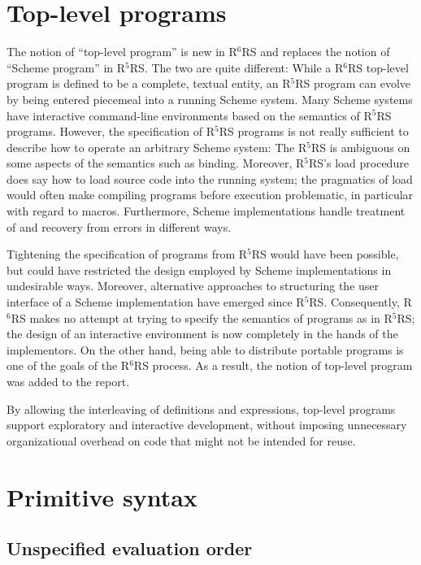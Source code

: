 \documentclass[twoside,twocolumn]{algol60}
\newcommand{\rn}[1]{R$^{#1}$RS}
\begin{document}
\chapter{Top-level programs}

The notion of ``top-level program'' is new in \rn{6} and replaces the
notion of ``Scheme program'' in \rn{5}.  The two are quite different:
While a \rn{6} top-level program is defined to be a complete, textual
entity, an \rn{5} program can evolve by being entered piecemeal into
a running Scheme system.  Many Scheme systems have interactive
command-line environments based on the semantics of \rn{5} programs.
However, the specification of \rn{5} programs is not really
sufficient to describe how to operate an arbitrary Scheme system: The
\rn{5} is ambiguous on some aspects of the semantics such as binding.
Moreover, \rn{5}'s {\cf load} procedure does say how to load source
code into the running system; the pragmatics of {\cf load} would
often make compiling programs before execution problematic, in
particular with regard to macros.  Furthermore, Scheme implementations
handle treatment of and recovery from errors in different ways.

Tightening the specification of programs from \rn{5} would have been
possible, but could have restricted the design employed by Scheme
implementations in undesirable ways.  Moreover, alternative approaches
to structuring the user interface of a Scheme implementation have
emerged since \rn{5}.  Consequently, \rn{6} makes no attempt at trying
to specify the semantics of programs as in \rn{5}; the design of an
interactive environment is now completely in the hands of the
implementors.  On the other hand, being able to distribute portable
programs is one of the goals of the \rn{6} process.  As a result, the
notion of top-level program was added to the report.

By allowing the interleaving of definitions and expressions, top-level 
programs support exploratory and interactive development, without 
imposing unnecessary organizational overhead on code that might not be 
intended for reuse.

\chapter{Primitive syntax}

\section{Unspecified evaluation order}
\end{document}
